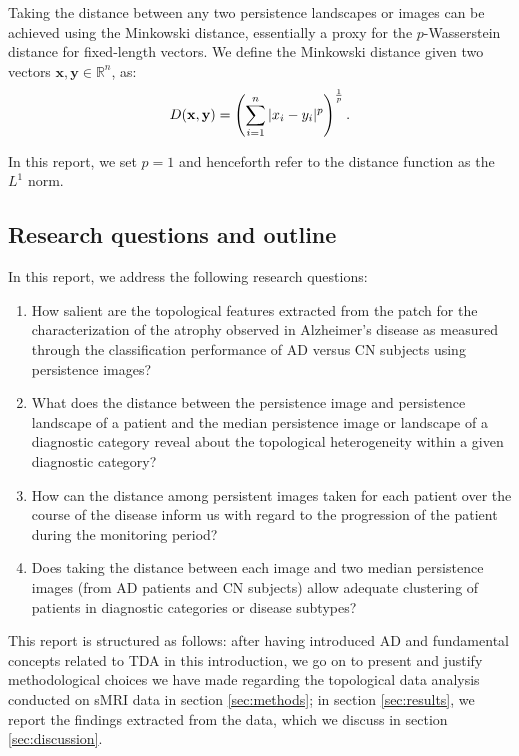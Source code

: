 \documentclass{article}
\begin{document}
Taking the distance between any two persistence landscapes or images can be achieved using the
Minkowski distance, essentially a proxy for the $p$-Wasserstein distance for fixed-length vectors.
We define the Minkowski distance given two vectors $\mathbf{x},\mathbf{y}\in\mathbb{R}^n$, as:
\begin{equation}
  \label{eq:minkowski}
  D(\mathbf{x},\mathbf{y}) = \left(\sum_{i=1}^{n}|x_i-y_i|^p\right)^{1\over p}.
\end{equation}

In this report, we set $p=1$ and henceforth refer to the distance function as the $L^1$ norm.

\subsection{Research questions and outline}

In this report, we address the following research questions:

\begin{enumerate}
\item How salient are the topological features extracted from the patch for the characterization of
  the atrophy observed in Alzheimer's disease as measured through the classification performance of
AD versus CN subjects using persistence images?
\item What does the distance between the persistence image and persistence
landscape of a patient and the median persistence image or landscape of a
diagnostic category reveal about the topological heterogeneity within a given
diagnostic category?
\item How can the distance among persistent images taken for each patient over the course of the
  disease inform us with regard to the progression of the patient during the monitoring period?
\item Does taking the distance between each image and two median persistence
images (from AD patients and CN subjects) allow adequate clustering of patients
in diagnostic categories or disease subtypes?
\end{enumerate}

This report is structured as follows: after having introduced AD and fundamental concepts related to
TDA in this introduction, we go on to present and justify methodological choices we have made
regarding the topological data analysis conducted on sMRI data in section \ref{sec:methods}; in
section \ref{sec:results}, we report the findings extracted from the data, which we discuss in
section \ref{sec:discussion}.
\end{document}
